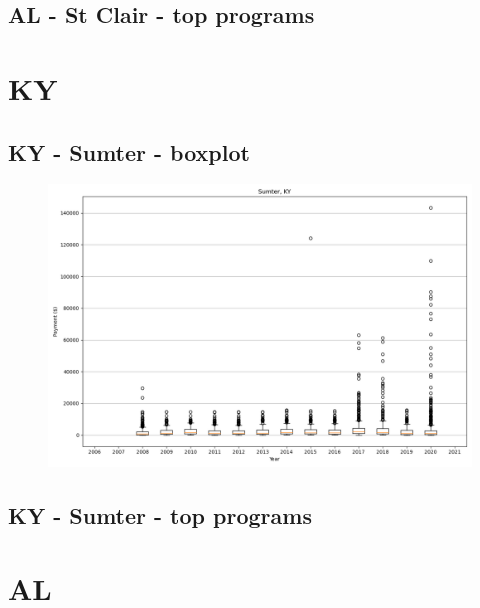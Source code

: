 \subsection*{AL - St Clair - top programs}

\newpage
\section*{KY}
\subsection*{KY - Sumter - boxplot}
\begin{figure}[h]
\centering
\includegraphics[width=7in]{../output/boxplots/counties/Sumter-KY_boxplot.png}
\end{figure}


\subsection*{KY - Sumter - top programs}

\newpage
\section*{AL}
